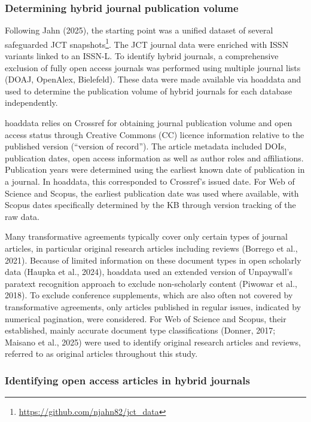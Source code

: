 \documentclass[a4paper,man,floatsintext,longtable,noextraspace,10pt]{apa6}
\begin{document}
\subsubsection{Determining hybrid journal publication
volume}\label{determining-hybrid-journal-publication-volume}

Following Jahn (2025), the starting point was a unified dataset of
several safeguarded JCT snapshots\footnote{\url{https://github.com/njahn82/jct_data}}.
The JCT journal data were enriched with ISSN variants linked to an
ISSN-L. To identify hybrid journals, a comprehensive exclusion of fully
open access journals was performed using multiple journal lists (DOAJ,
OpenAlex, Bielefeld). These data were made available via hoaddata and
used to determine the publication volume of hybrid journals for each
database independently.

hoaddata relies on Crossref for obtaining journal publication volume and
open access status through Creative Commons (CC) licence information
relative to the published version (``version of record''). The article
metadata included DOIs, publication dates, open access information as
well as author roles and affiliations. Publication years were determined
using the earliest known date of publication in a journal. In hoaddata,
this corresponded to Crossref's issued date. For Web of Science and
Scopus, the earliest publication date was used where available, with
Scopus dates specifically determined by the KB through version tracking
of the raw data.

Many transformative agreements typically cover only certain types of
journal articles, in particular original research articles including
reviews (Borrego et al., 2021). Because of limited information on these
document types in open scholarly data (Haupka et al., 2024), hoaddata
used an extended version of Unpaywall's paratext recognition approach to
exclude non-scholarly content (Piwowar et al., 2018). To exclude
conference supplements, which are also often not covered by
transformative agreements, only articles published in regular issues,
indicated by numerical pagination, were considered. For Web of Science
and Scopus, their established, mainly accurate document type
classifications (Donner, 2017; Maisano et al., 2025) were used to
identify original research articles and reviews, referred to as original
articles throughout this study.

\subsubsection{Identifying open access articles in hybrid
journals}\label{identifying-open-access-articles-in-hybrid-journals}
\end{document}
